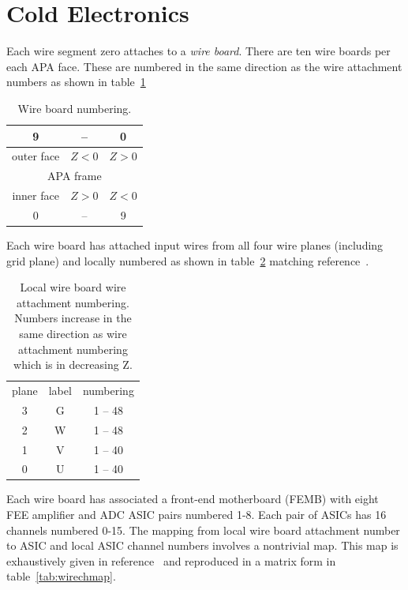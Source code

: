 \documentclass[pdftex,12pt,letter]{article}
\begin{document}
\section{Cold Electronics}

Each wire segment zero attaches to a \textit{wire board}.  There are
ten wire boards per each APA face.  These are numbered in the same
direction as the wire attachment numbers as shown in table~\ref{tab:wireboards}

\begin{table}[htp]
  \label{tab:wireboards}
  \centering
  \begin{tabular}[h]{ccc}
    \hline
     9 & -- & 0 \\
    \hline
    outer face & $Z<0$  & $Z>0$\\
    \hline
    \multicolumn{3}{|c|}{APA frame}\\
    \hline
    inner face & $Z>0$ & $Z<0$\\
    \hline
    0 & -- & 9 \\
    \hline
  \end{tabular}
  \caption{Wire board numbering.}
\end{table}

Each wire board has attached input wires from all four wire planes
(including grid plane) and locally numbered as shown in
table~\ref{tab:wireboard} matching reference~\cite{docdb2060-v3-adaptor-board-0}.

\begin{table}[htp]
  \label{tab:wireboard}
  \centering
  \begin{tabular}[h]{ccc}
    plane & label & numbering \\
    3 & G & 1 -- 48 \\
    2 & W & 1 -- 48 \\
    1 & V & 1 -- 40 \\
    0 & U & 1 -- 40 \\
  \end{tabular}
  \caption{Local wire board wire attachment numbering.  Numbers increase in the same direction as wire attachment numbering which is in decreasing Z.}
\end{table}

Each wire board has associated a front-end motherboard (FEMB) with
eight FEE amplifier and ADC ASIC pairs numbered 1-8.  Each pair of
ASICs has 16 channels numbered 0-15.  The mapping from local wire
board attachment number to ASIC and local ASIC channel numbers
involves a nontrivial map.  This map is exhaustively given in
reference~\cite{wirechmap} and reproduced in a matrix form in
table~\ref{tab:wirechmap}.
\end{document}
